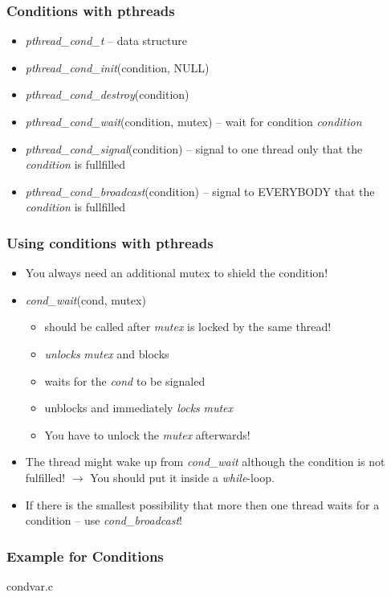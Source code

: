 \documentclass[10pt]{beamer}
\begin{document}
\begin{frame}
    \frametitle{Conditions with pthreads}
    \begin{itemize}
    \item {\it pthread\_cond\_t} -- data structure
\item {\it pthread\_cond\_init}(condition, NULL)
\item {\it pthread\_cond\_destroy}(condition)
\item {\it pthread\_cond\_wait}(condition, mutex) -- wait for condition {\it condition}
\item {\it pthread\_cond\_signal}(condition) -- signal to one thread only that the {\it condition} is fullfilled
\item {\it pthread\_cond\_broadcast}(condition)  -- signal to EVERYBODY that the {\it condition} is fullfilled
    \end{itemize}
\end{frame}


\begin{frame}
    \frametitle{Using conditions with pthreads}
    \begin{itemize}
        \item You always need an additional mutex to shield the condition!
        \item {\it cond\_wait}(cond, mutex)
        \begin{itemize}
            \item should be called after {\it mutex} is locked by the same thread!
            \item \emph{unlocks} {\it mutex} and blocks
            \item waits for the {\it cond} to be signaled
            \item unblocks and immediately \emph{locks} {\it mutex}
            \item You have to unlock the {\it mutex} afterwards!
        \end{itemize}
        \item The thread might wake up from {\it cond\_wait} although the condition is not fulfilled! $\rightarrow$ You should put it inside a {\it while}-loop.
        \item If there is the smallest possibility that more then one thread waits for a condition -- use {\it cond\_broadcast}!
    \end{itemize}
\end{frame}


\begin{frame}
    \frametitle{Example for Conditions}
    condvar.c
\end{frame}
\end{document}
